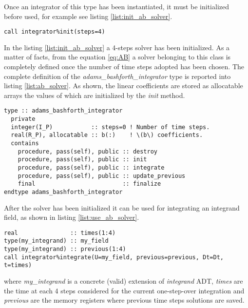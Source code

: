 \documentclass[pdftex,preprint,3p,times,numbers]{elsarticle}
\begin{document}
Once an integrator of this type has been instantiated, it must be initialized before used, for example see listing \ref{list:init_ab_solver}.

\begin{lstlisting}[firstnumber=1,style=code,caption={example of initialization of an explicit Adams-Bashforth integrator},label={list:init_ab_solver}]
call integrator%init(steps=4)
\end{lstlisting}

In the listing \ref{list:init_ab_solver} a 4-steps solver has been initialized. As a matter of facts, from the equation \ref{eq:AB} a solver belonging to this class is completely defined once the number of time steps adopted has been chosen. The complete definition of the \emph{adams\_bashforth\_integrator} type is reported into listing \ref{list:ab_solver}. As shown, the linear coefficients are stored as allocatable arrays the values of which are initialized by the \emph{init} method.

\begin{lstlisting}[firstnumber=1,style=code,caption={definition of \emph{adams\_bashforth\_integrator} type},label={list:ab_solver}]
type :: adams_bashforth_integrator
  private
  integer(I_P)           :: steps=0 ! Number of time steps.
  real(R_P), allocatable :: b(:)    ! \(b\) coefficients.
  contains
    procedure, pass(self), public :: destroy
    procedure, pass(self), public :: init
    procedure, pass(self), public :: integrate
    procedure, pass(self), public :: update_previous
    final                         :: finalize
endtype adams_bashforth_integrator
\end{lstlisting}

After the solver has been initialized it can be used for integrating an integrand field, as shown in listing \ref{list:use_ab_solver}.

\begin{lstlisting}[firstnumber=1,style=code,caption={example of usage of an Adams-Bashforth integrator},label={list:use_ab_solver}]
real               :: times(1:4)
type(my_integrand) :: my_field
type(my_integrand) :: previous(1:4)
call integrator%integrate(U=my_field, previous=previous, Dt=Dt, t=times)
\end{lstlisting}
where \emph{my\_integrand} is a concrete (valid) extension of \emph{integrand} ADT, \emph{times} are the time at each 4 steps considered for the current one-step-over integration and \emph{previous} are the memory registers where previous time steps solutions are saved.
\end{document}
